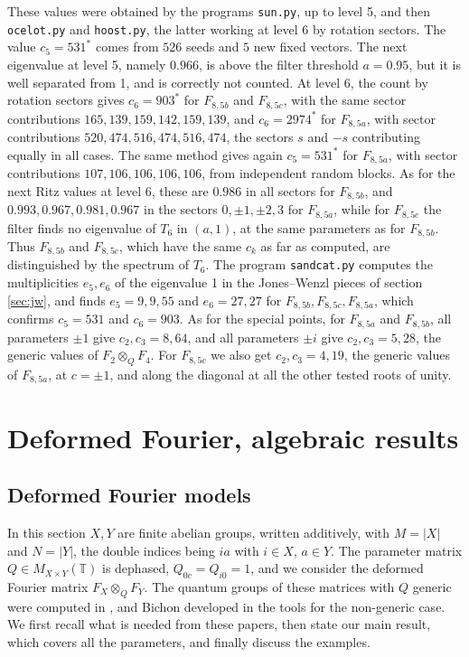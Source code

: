 \documentclass[11pt]{amsart}
\newcommand{\T}{\mathbb T}
\begin{document}
\medskip

\noindent These values were obtained by the programs \texttt{sun.py}, up to level 5, and then \texttt{ocelot.py} and \texttt{hoost.py}, the latter working at level 6 by rotation sectors. The value $c_5=531^*$ comes from $526$ seeds and $5$ new fixed vectors. The next eigenvalue at level 5, namely $0.966$, is above the filter threshold $a=0.95$, but it is well separated from 1, and is correctly not counted. At level 6, the count by rotation sectors gives $c_6=903^*$ for $F_{8,5b}$ and $F_{8,5c}$, with the same sector contributions $165,139,159,142,159,139$, and $c_6=2974^*$ for $F_{8,5a}$, with sector contributions $520,474,516,474,516,474$, the sectors $s$ and $-s$ contributing equally in all cases. The same method gives again $c_5=531^*$ for $F_{8,5a}$, with sector contributions $107,106,106,106,106$, from independent random blocks. As for the next Ritz values at level 6, these are $0.986$ in all sectors for $F_{8,5b}$, and $0.993,0.967,0.981,0.967$ in the sectors $0,\pm1,\pm2,3$ for $F_{8,5a}$, while for $F_{8,5c}$ the filter finds no eigenvalue of $T_6$ in $(a,1)$, at the same parameters as for $F_{8,5b}$. Thus $F_{8,5b}$ and $F_{8,5c}$, which have the same $c_k$ as far as computed, are distinguished by the spectrum of $T_6$. The program \texttt{sandcat.py} computes the multiplicities $e_5,e_6$ of the eigenvalue 1 in the Jones--Wenzl pieces of section \ref{sec:jw}, and finds $e_5=9,9,55$ and $e_6=27,27$ for $F_{8,5b},F_{8,5c},F_{8,5a}$, which confirms $c_5=531$ and $c_6=903$. As for the special points, for $F_{8,5a}$ and $F_{8,5b}$, all parameters $\pm1$ give $c_2,c_3=8,64$, and all parameters $\pm i$ give $c_2,c_3=5,28$, the generic values of $F_2\otimes_QF_4$. For $F_{8,5c}$ we also get $c_2,c_3=4,19$, the generic values of $F_{8,5a}$, at $c=\pm1$, and along the diagonal at all the other tested roots of unity.

\section{Deformed Fourier, algebraic results}\label{sec:cumul}

\subsection{Deformed Fourier models}\label{sec:bb}

In this section $X,Y$ are finite abelian groups, written additively, with $M=|X|$ and $N=|Y|$, the double indices being $ia$ with $i\in X$, $a\in Y$. The parameter matrix $Q\in M_{X\times Y}(\T)$ is dephased, $Q_{0c}=Q_{i0}=1$, and we consider the deformed Fourier matrix $F_X\otimes_QF_Y$. The quantum groups of these matrices with $Q$ generic were computed in \cite{bb3}, and Bichon developed in \cite{bic} the tools for the non-generic case. We first recall what is needed from these papers, then state our main result, which covers all the parameters, and finally discuss the examples.
\end{document}
